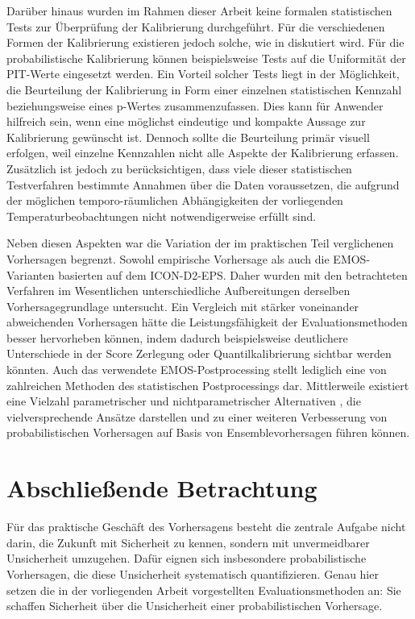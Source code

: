 Darüber hinaus wurden im Rahmen dieser Arbeit keine formalen statistischen Tests zur Überprüfung der Kalibrierung durchgeführt. Für die verschiedenen Formen der Kalibrierung existieren jedoch solche, wie in \textcite[B.4]{gneiting2023regression} diskutiert wird. Für die probabilistische Kalibrierung können beispielsweise Tests auf die Uniformität der PIT-Werte eingesetzt werden. Ein Vorteil solcher Tests liegt in der Möglichkeit, die Beurteilung der Kalibrierung in Form einer einzelnen statistischen Kennzahl beziehungsweise eines p-Wertes zusammenzufassen. Dies kann für Anwender hilfreich sein, wenn eine möglichst eindeutige und kompakte Aussage zur Kalibrierung gewünscht ist. Dennoch sollte die Beurteilung primär visuell erfolgen, weil einzelne Kennzahlen nicht alle Aspekte der Kalibrierung erfassen. Zusätzlich ist jedoch zu berücksichtigen, dass viele dieser statistischen Testverfahren bestimmte Annahmen über die Daten voraussetzen, die aufgrund der möglichen temporo-räumlichen Abhängigkeiten der vorliegenden Temperaturbeobachtungen nicht notwendigerweise erfüllt sind.

Neben diesen Aspekten war die Variation der im praktischen Teil verglichenen Vorhersagen begrenzt. Sowohl empirische Vorhersage als auch die EMOS-Varianten basierten auf dem ICON-D2-EPS. Daher wurden mit den betrachteten Verfahren im Wesentlichen unterschiedliche Aufbereitungen derselben Vorhersagegrundlage untersucht. Ein Vergleich mit stärker voneinander abweichenden Vorhersagen hätte die Leistungsfähigkeit der Evaluationsmethoden besser hervorheben können, indem dadurch beispielsweise deutlichere Unterschiede in der Score Zerlegung oder Quantilkalibrierung sichtbar werden könnten. Auch das verwendete EMOS-Postprocessing stellt lediglich eine von zahlreichen Methoden des statistischen Postprocessings dar. Mittlerweile existiert eine Vielzahl parametrischer und nichtparametrischer Alternativen \parencite{vannitsem_statistical_2021}, die vielversprechende Ansätze darstellen und zu einer weiteren Verbesserung von probabilistischen Vorhersagen auf Basis von Ensemblevorhersagen führen können.

\section{Abschließende Betrachtung}
Für das praktische Geschäft des Vorhersagens besteht die zentrale Aufgabe nicht darin, die Zukunft mit Sicherheit zu kennen, sondern mit unvermeidbarer Unsicherheit umzugehen. Dafür eignen sich insbesondere probabilistische Vorhersagen, die diese Unsicherheit systematisch quantifizieren. Genau hier setzen die in der vorliegenden Arbeit vorgestellten Evaluationsmethoden an: Sie schaffen Sicherheit über die Unsicherheit einer probabilistischen Vorhersage.

